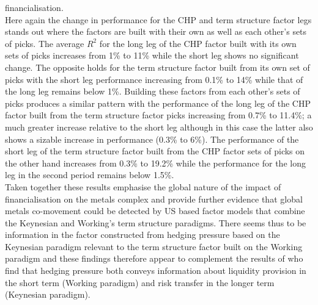 \documentclass[
  authoryear,
  preprint,
  3p]{elsarticle}
\begin{document}
financialisation.\\
Here again the change in performance for the CHP and term structure
factor legs stands out where the factors are built with their own as
well as each other's sets of picks. The average \(R^{2}\) for the long
leg of the CHP factor built with its own sets of picks increases from
1\% to 11\% while the short leg shows no significant change. The
opposite holds for the term structure factor built from its own set of
picks with the short leg performance increasing from 0.1\% to 14\% while
that of the long leg remains below 1\%. Building these factors from each
other's sets of picks produces a similar pattern with the performance of
the long leg of the CHP factor built from the term structure factor
picks increasing from 0.7\% to 11.4\%; a much greater increase relative
to the short leg although in this case the latter also shows a sizable
increase in performance (0.3\% to 6\%). The performance of the short leg
of the term structure factor built from the CHP factor sets of picks on
the other hand increases from 0.3\% to 19.2\% while the performance for
the long leg in the second period remains below 1.5\%.\\
Taken together these results emphasise the global nature of the impact
of financialisation on the metals complex and provide further evidence
that global metals co-movement could be detected by US based factor
models that combine the Keynesian and Working's term structure
paradigms. There seems thus to be information in the factor constructed
from hedging pressure based on the Keynesian paradigm relevant to the
term structure factor built on the Working paradigm and these findings
therefore appear to complement the results of \citet{kang_tale_2020} who
find that hedging pressure both conveys information about liquidity
provision in the short term (Working paradigm) and risk transfer in the
longer term (Keynesian paradigm).

\bigskip
\bigskip
\end{document}

